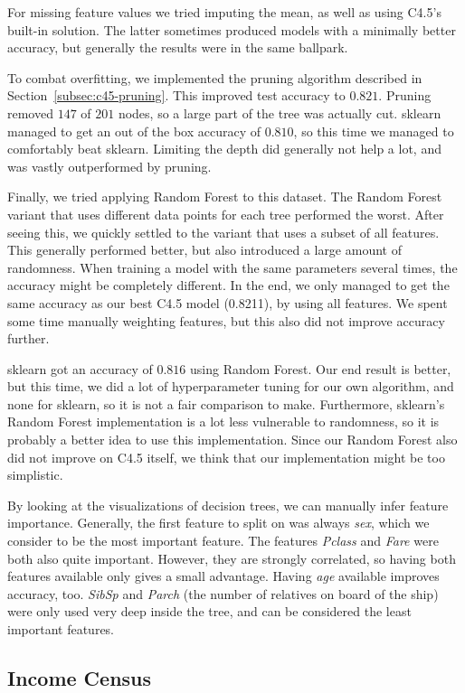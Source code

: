 \documentclass[a4paper]{article}
\begin{document}
For missing feature values we tried imputing the mean, as well as using C4.5's built-in solution. The latter sometimes produced models with a minimally better accuracy, but generally the results were in the same ballpark.

To combat overfitting, we implemented the pruning algorithm described in Section~\ref{subsec:c45-pruning}. This improved test accuracy to $0.821$. Pruning removed $147$ of $201$ nodes, so a large part of the tree was actually cut. sklearn managed to get an out of the box accuracy of $0.810$, so this time we managed to comfortably beat sklearn.
Limiting the depth did generally not help a lot, and was vastly outperformed by pruning.

Finally, we tried applying Random Forest to this dataset. The Random Forest variant that uses different data points for each tree performed the worst. After seeing this, we quickly settled to the variant that uses a subset of all features. This generally performed better, but also introduced a large amount of randomness. When training a model with the same parameters several times, the accuracy might be completely different. In the end, we only managed to get the same accuracy as our best C4.5 model (0.8211), by using all features.  We spent some time manually weighting features, but this also did not improve accuracy further.

sklearn got an accuracy of $0.816$ using Random Forest. Our end result is better, but this time, we did a lot of hyperparameter tuning for our own algorithm, and none for sklearn, so it is not a fair comparison to make. Furthermore, sklearn's Random Forest implementation is a lot less vulnerable to randomness, so it is probably a better idea to use this implementation. Since our Random Forest also did not improve on C4.5 itself, we think that our implementation might be too simplistic.

By looking at the visualizations of decision trees, we can manually infer feature importance. Generally, the first feature to split on was always \emph{sex}, which we consider to be the most important feature. The features \emph{Pclass} and \emph{Fare} were both also quite important. However, they are strongly correlated, so having both features available only gives a small advantage. Having \emph{age} available improves accuracy, too. \emph{SibSp} and \emph{Parch} (the number of relatives on board of the ship) were only used very deep inside the tree, and can be considered the least important features.

\subsection{Income Census}
\end{document}
